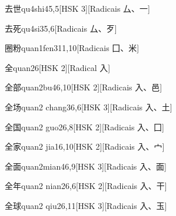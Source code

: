 \begin{entry}{去世}{qu4shi4}{5,5}[HSK 3][Radicais ⼛、⼀]
\end{entry}

\begin{entry}{去死}{qu4si3}{5,6}[Radicais ⼛、⽍]
\end{entry}

\begin{entry}{圈粉}{quan1fen3}{11,10}[Radicais ⼞、⽶]
\end{entry}

\begin{entry}{全}{quan2}{6}[HSK 2][Radical ⼊]
\end{entry}

\begin{entry}{全部}{quan2bu4}{6,10}[HSK 2][Radicais ⼊、⾢]
\end{entry}

\begin{entry}{全场}{quan2 chang3}{6,6}[HSK 3][Radicais ⼊、⼟]
\end{entry}

\begin{entry}{全国}{quan2 guo2}{6,8}[HSK 2][Radicais ⼊、⼞]
\end{entry}

\begin{entry}{全家}{quan2 jia1}{6,10}[HSK 2][Radicais ⼊、⼧]
\end{entry}

\begin{entry}{全面}{quan2mian4}{6,9}[HSK 3][Radicais ⼊、⾯]
\end{entry}

\begin{entry}{全年}{quan2 nian2}{6,6}[HSK 2][Radicais ⼊、⼲]
\end{entry}

\begin{entry}{全球}{quan2 qiu2}{6,11}[HSK 3][Radicais ⼊、⽟]
\end{entry}

